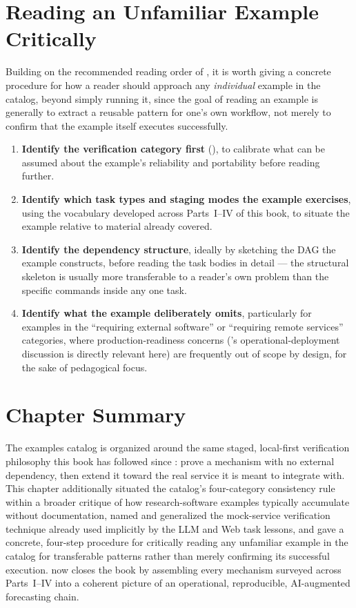 \section{Reading an Unfamiliar Example Critically}

Building on the recommended reading order of , it
is worth giving a concrete procedure for how a reader should approach any
\emph{individual} example in the catalog, beyond simply running it, since
the goal of reading an example is generally to extract a reusable pattern
for one's own workflow, not merely to confirm that the example itself
executes successfully.

\begin{enumerate}[leftmargin=1.8em]
  \item \textbf{Identify the verification category first}
    (), to calibrate what can be assumed about
    the example's reliability and portability before reading further.
  \item \textbf{Identify which task types and staging modes the example
    exercises}, using the vocabulary developed across Parts~I--IV of
    this book, to situate the example relative to material already covered.
  \item \textbf{Identify the dependency structure}, ideally by sketching the
    DAG the example constructs, before reading the task bodies in detail
    --- the structural skeleton is usually more transferable to a reader's
    own problem than the specific commands inside any one task.
  \item \textbf{Identify what the example deliberately omits}, particularly
    for examples in the ``requiring external software'' or ``requiring
    remote services'' categories, where production-readiness concerns
    ('s operational-deployment discussion is directly
    relevant here) are frequently out of scope by design, for the sake of
    pedagogical focus.
\end{enumerate}

\section{Chapter Summary}

The examples catalog is organized around the same staged, local-first
verification philosophy this book has followed since :
prove a mechanism with no external dependency, then extend it toward the
real service it is meant to integrate with. This chapter additionally
situated the catalog's four-category consistency rule within a broader
critique of how research-software examples typically accumulate without
documentation, named and generalized the mock-service verification
technique already used implicitly by the LLM and Web task lessons, and gave
a concrete, four-step procedure for critically reading any unfamiliar
example in the catalog for transferable patterns rather than merely
confirming its successful execution.  now closes the
book by assembling every mechanism surveyed across Parts~I--IV into a
coherent picture of an operational, reproducible, AI-augmented
forecasting chain.

